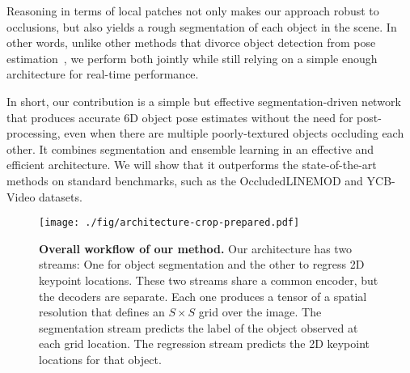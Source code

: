 \documentclass[10pt,twocolumn,letterpaper]{article}
\begin{document}
Reasoning in terms of local patches not only makes our approach robust to occlusions, but also yields a rough segmentation of each object in the scene. In other words, unlike other methods that divorce object detection from pose estimation~\cite{Rad17,Kehl17,Xiang18b}, we perform both jointly while still relying on a simple enough architecture for real-time performance.

In short, our contribution is a simple but effective segmentation-driven network that produces accurate 6D object pose estimates without the need for post-processing, even when there are multiple poorly-textured objects occluding each other. It combines segmentation and ensemble learning in an effective and efficient architecture. We will show that it outperforms the state-of-the-art methods on standard benchmarks, such as the OccludedLINEMOD and YCB-Video datasets.



\begin{figure*}
	\centering
	\texttt{[image: ./fig/architecture-crop-prepared.pdf]}
	\vspace{-3mm}
	\caption{{\bf Overall workflow of our method.} Our architecture has two streams: One for object segmentation and the other to regress 2D keypoint locations. These two streams share a common encoder, but the decoders are separate. Each one produces a tensor of a spatial resolution that defines an $S\times S$ grid over the image. The segmentation stream predicts the label of the object observed at each grid location. The regression stream predicts the 2D keypoint locations for that object. 
}
	\label{fig:architecture}
\end{figure*}
 
 
\end{document}
